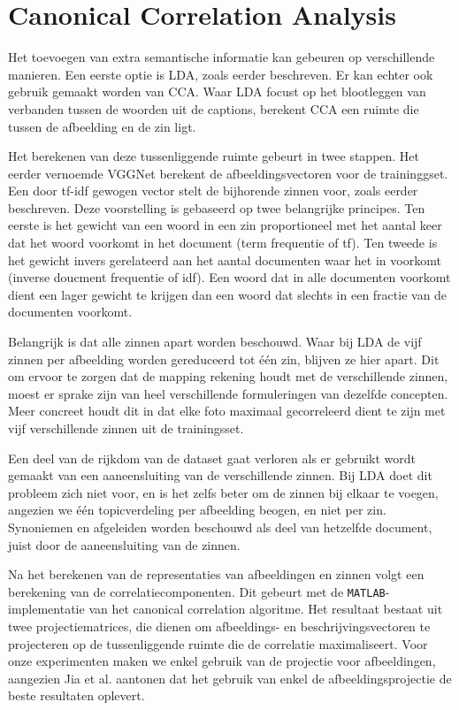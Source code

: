 \section{Canonical Correlation Analysis}
Het toevoegen van extra semantische informatie kan gebeuren op verschillende manieren. Een eerste optie is LDA, zoals eerder beschreven. Er kan echter ook gebruik gemaakt worden van CCA. Waar LDA focust op het blootleggen van verbanden tussen de woorden uit de captions, berekent CCA een ruimte die tussen de afbeelding en de zin ligt.

Het berekenen van deze tussenliggende ruimte gebeurt in twee stappen. Het eerder vernoemde VGGNet berekent de afbeeldingsvectoren voor de traininggset. Een door tf-idf gewogen vector stelt de bijhorende zinnen voor, zoals eerder beschreven. Deze voorstelling is gebaseerd op twee belangrijke principes. Ten eerste is het gewicht van een woord in een zin proportioneel met het aantal keer dat het woord voorkomt in het document (term frequentie of tf). Ten tweede is het gewicht invers gerelateerd aan het aantal documenten waar het in voorkomt (inverse doucment frequentie of idf). Een woord dat in alle documenten voorkomt dient een lager gewicht te krijgen dan een woord dat slechts in een fractie van de documenten voorkomt.

Belangrijk is dat alle zinnen apart worden beschouwd. Waar bij LDA de vijf zinnen per afbeelding worden gereduceerd tot \'e\'en zin, blijven ze hier apart. Dit om ervoor te zorgen dat de mapping rekening houdt met de verschillende zinnen, moest er sprake zijn van heel verschillende formuleringen van dezelfde concepten. Meer concreet houdt dit in dat elke foto maximaal gecorreleerd dient te zijn met vijf verschillende zinnen uit de trainingsset.

Een deel van de rijkdom van de dataset gaat verloren als er gebruikt wordt gemaakt van een aaneensluiting van de verschillende zinnen. Bij LDA doet dit probleem zich niet voor, en is het zelfs beter om de zinnen bij elkaar te voegen, angezien we \'e\'en topicverdeling per afbeelding beogen, en niet per zin. Synoniemen en afgeleiden worden beschouwd als deel van hetzelfde document, juist door de aaneensluiting van de zinnen.

Na het berekenen van de representaties van afbeeldingen en zinnen volgt een berekening van de correlatiecomponenten. Dit gebeurt met de \texttt{MATLAB}-implementatie van het canonical correlation algoritme. Het resultaat bestaat uit twee projectiematrices, die dienen om afbeeldings- en beschrijvingsvectoren te projecteren op de tussenliggende ruimte die de correlatie maximaliseert. Voor onze experimenten maken we enkel gebruik van de projectie voor afbeeldingen, aangezien Jia et al.\cite{Fernando2015} aantonen dat het gebruik van enkel de afbeeldingsprojectie de beste resultaten oplevert.


